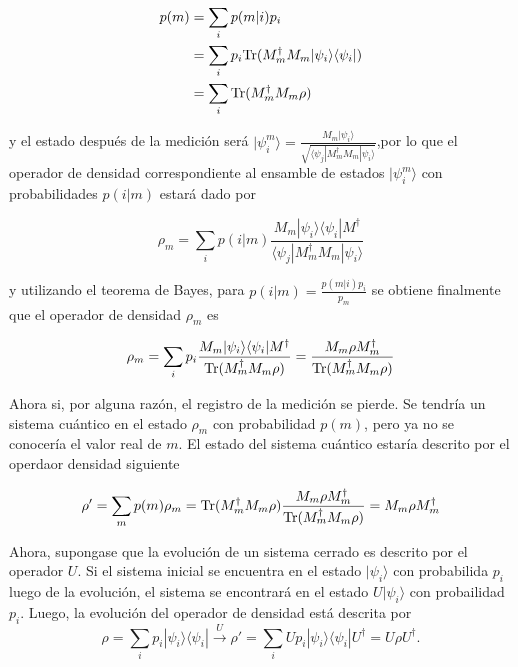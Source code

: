 \begin{equation}
	\label{probabilidad_m}
	\begin{split}
	p(m) &= \sum_{i}p(m|i)p_i\\
	&=\sum_i p_i{\rm Tr}(M_m^{\dagger} M_m |\psi_i\rangle \langle\psi_i|)\\
	&=\sum_{i}{\rm Tr}(M_m^{\dagger} M_m \rho)
	\end{split}
\end{equation}
	


y el estado después de la medición será $|\psi_i^m\rangle=\frac{M_m|\psi_i\rangle}{\sqrt{\langle\psi_j|M_m^{\dagger}M_m|\psi_i\rangle}}$,por lo que el operador de densidad correspondiente al ensamble de estados $|\psi_i^m\rangle$ con probabilidades $p(i|m)$ estará dado por

\[\rho_m=\sum_i p(i|m)\frac{M_m|\psi_i\rangle \langle \psi_i|M^{\dagger}}{\langle\psi_j|M_m^{\dagger}M_m|\psi_i\rangle}\]

y  utilizando el teorema de Bayes, para $p(i|m)=\frac{p(m|i)p_i}{p_m}$ se obtiene finalmente que el operador de densidad $\rho_m$ es{\cite{nielsen_chuang_2010}}

\begin{equation}
	\rho_m=\sum_i p_i \dfrac{M_m|\psi_i\rangle \langle \psi_i|M^{\dagger}}{{\rm Tr}(M^{\dagger}_m M_m \rho )}=\dfrac{M_m \rho M_m^{\dagger}}{{\rm Tr} (M^{\dagger}_m M_m\rho )}
\end{equation}


Ahora si, por alguna razón, el registro de la medición se pierde. Se tendría un sistema cuántico en el estado $\rho_m$ con probabilidad $p(m)$, pero ya no se conocería el valor real de $m$. El estado del sistema cuántico estaría descrito por el operdaor densidad siguiente

\begin{equation}
	\rho'=\sum_m p(m)\rho_m={\rm Tr}(M^{\dagger}_m M_m\rho )\dfrac{M_m\rho M_m^{\dagger}}{{\rm Tr} (M^{\dagger}_m M_m \rho )}=M_m\rho M_m^{\dagger}
\end{equation}


 
 Ahora, supongase que la evolución de un sistema cerrado es descrito por el operador $U$. Si el sistema inicial se encuentra en el estado $|\psi_i\rangle$ con probabilida $p_i$ luego de la evolución, el sistema se encontrará en el estado $U|\psi_i\rangle$ con probailidad $p_i$. Luego, la evolución del operador de densidad está descrita por {\cite{nielsen_chuang_2010}} \[\rho=\sum_{i}p_i|\psi_i\rangle \langle \psi_i|\xrightarrow{U}\rho'=\sum_{i}Up_i|\psi_i\rangle \langle \psi_i|U^{\dagger}=U\rho U^{\dagger}.\]


